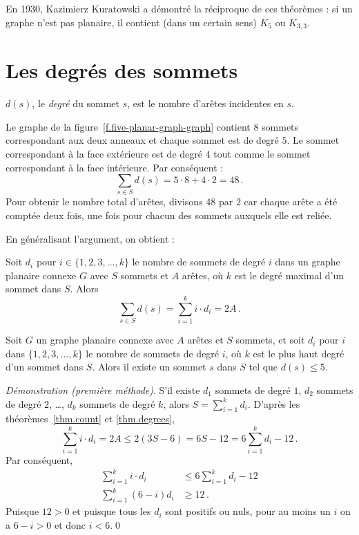 En 1930, Kazimierz Kuratowski a démontré la réciproque de ces théorèmes : si un graphe n'est pas planaire, il contient (dans un certain sens) $K_5$ ou $K_{3,3}$.

\section{Les degrés des sommets}\label{s.degrees}

\begin{definition}
$d(s)$, le \emph{degré} du sommet $s$, est le nombre d'arêtes incidentes en $s$.
\end{definition}

\begin{example}
Le graphe de la figure~\ref{f.five-planar-graph-graph} contient $8$ sommets correspondant aux deux anneaux et chaque sommet est de degré $5$. Le sommet correspondant à la face extérieure est de degré $4$ tout comme le sommet correspondant à la face intérieure. Par conséquent :
\[
\sum_{s\in S} d(s) = 5\cdot 8 + 4\cdot 2=48\,.
\]
Pour obtenir le nombre total d'arêtes, divisons 48 par $2$ car chaque arête a été comptée deux fois, une fois pour chacun des sommets auxquels elle est reliée.
\end{example}



En généralisant l'argument, on obtient :
\begin{theorem}\label{thm.degrees}
Soit $d_i$ pour $i\in \{1,2,3,\ldots,k\}$ le nombre de sommets de degré $i$ dans un graphe planaire connexe $G$ avec $S$ sommets et $A$ arêtes, où $k$ est le  degré maximal d'un sommet dans $S$. Alors 
\[
\sum_{s\in S} d(s) =\sum_{i=1}^{k} i\cdot d_i=2A\,.
\]
\end{theorem}

\begin{theorem}\label{thm.degree5}
Soit $G$ un graphe planaire connexe avec $A$ arêtes et $S$ sommets, et soit $d_i$ pour $i$ dans $\{1,2,3,\ldots,k\}$ le nombre de sommets de degré $i$, où $k$ est le plus haut degré d'un sommet dans $S$. Alors il existe un sommet $s$ dans $S$ tel que $d(s) \leq 5$.
\end{theorem}

\noindent \emph{Démonstration (première méthode)}. 
S'il existe $d_1$ sommets de degré $1$, $d_2$ sommets de degré $2$, \ldots, $d_k$ sommets de degré $k$, alors $S=\sum_{i=1}^{k}d_i$.  D'après les théorèmes~\ref{thm.count} et \ref{thm.degrees},
\[
\sum_{i=1}^{k} i\cdot d_i=2A\leq 2(3S-6) = 6S-12=6\sum_{i=1}^{k} d_i -12\,.
\]
Par conséquent,
%
\begin{align*}
\sum_{i=1}^{k} i\cdot d_i &\leq 6\sum_{i=1}^{k} d_i -12\\
\sum_{i=1}^{k} (6-i)d_i&\geq 12\,.
\end{align*}
Puisque $12>0$ et puisque tous les $d_i$ sont positifs ou nuls, pour au moins un $i$ on a $6-i>0$ et donc $i<6$.\qed

